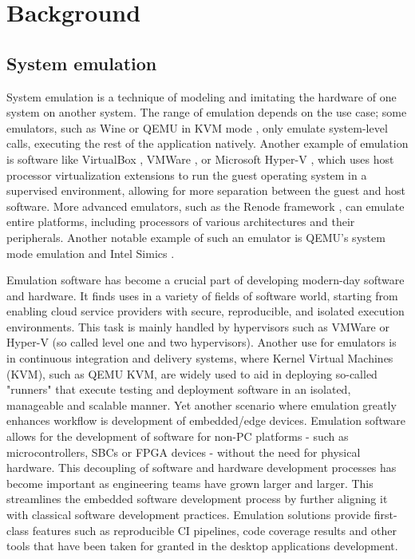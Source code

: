 
\chapter{Background}


\section{System emulation}

System emulation is a technique of modeling and imitating the hardware of one system on another system. The range of emulation depends on the use case; some emulators, such as Wine \cite{Wine}
or QEMU in KVM mode \cite{QemuKVM}, only emulate system-level calls, executing the rest of the application natively. Another example of emulation is software like VirtualBox \cite{VirtualBox}, VMWare \cite{VMWareWorkstation}, or Microsoft
Hyper-V \cite{hyperv}, which uses host processor virtualization extensions to run the guest operating system in a supervised environment, allowing for more separation between the guest and host software.
More advanced emulators, such as the Renode framework \cite{Renode}, can emulate entire platforms, including processors of various architectures and their peripherals. Another notable example of
such an emulator is QEMU's system mode emulation \cite{Qemu} and Intel Simics \cite{simics}.

Emulation software has become a crucial part of developing modern-day software and hardware. It finds uses in a variety of fields of software world, starting from enabling cloud
service providers with secure, reproducible, and isolated execution environments. This task is mainly handled by hypervisors such as VMWare or Hyper-V (so called level one and two hypervisors).
Another use for emulators is in continuous integration and delivery systems, where Kernel Virtual Machines (KVM), such as QEMU KVM, are widely used to aid in deploying
so-called "runners" that execute testing and deployment software in an isolated, manageable and scalable manner. Yet another scenario where emulation greatly enhances workflow is
development of embedded/edge devices. Emulation software allows for the development of software for non-PC platforms - such as microcontrollers, SBCs or FPGA devices - without the
need for physical hardware. This decoupling of software and hardware development processes has become important as engineering teams have grown larger and larger. This streamlines the embedded software development process by
further aligning it with classical software development practices. Emulation solutions provide first-class features such as reproducible CI pipelines, code coverage results and
other tools that have been taken for granted in the desktop applications development.


